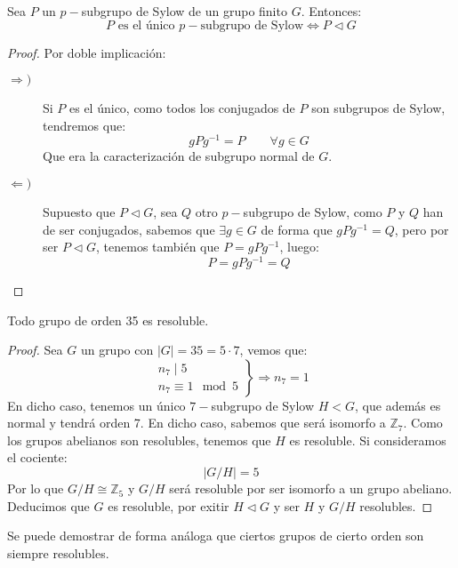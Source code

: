 \begin{coro}
    Sea $P$ un $p-$subgrupo de Sylow de un grupo finito $G$. Entonces:
    \begin{equation*}
        P \text{\ es el único $p-$subgrupo de Sylow} \Longleftrightarrow P\lhd G
    \end{equation*}
    \begin{proof}
            Por doble implicación:
        \begin{description}
            \item [$\Longrightarrow)$] Si $P$ es el único, como todos los conjugados de $P$ son subgrupos de Sylow, tendremos que:
                \begin{equation*}
                    gPg^{-1} = P \qquad \forall g\in G
                \end{equation*}
                Que era la caracterización de subgrupo normal de $G$.
            \item [$\Longleftarrow)$] Supuesto que $P\lhd G$, sea $Q$ otro $p-$subgrupo de Sylow, como $P$ y $Q$ han de ser conjugados, sabemos que $\exists g\in G$ de forma que $gPg^{-1} = Q$, pero por ser $P\lhd G$, tenemos también que $P = gPg^{-1}$, luego:
                \begin{equation*}
                    P = gPg^{-1} = Q
                \end{equation*} \qedhere
        \end{description}
    \end{proof}
\end{coro}

\begin{ejemplo}
    Todo grupo de orden 35 es resoluble.
    \begin{proof}
        Sea $G$ un grupo con $|G| = 35 = 5\cdot 7$, vemos que:
        \begin{equation*}
            \left.\begin{array}{r}
                n_7 \mid 5 \\
                n_7\equiv 1 \mod 5
            \end{array}\right\} \Longrightarrow n_7 = 1
        \end{equation*}
        En dicho caso, tenemos un único $7-$subgrupo de Sylow $H<G$, que además es normal y tendrá orden 7. En dicho caso, sabemos que será isomorfo a $\mathbb{Z}_7$. Como los grupos abelianos son resolubles, tenemos que $H$ es resoluble. Si consideramos el cociente:
        \begin{equation*}
            |G/H| = 5
        \end{equation*}
        Por lo que $G/H\cong \mathbb{Z}_5$ y $G/H$ será resoluble por ser isomorfo a un grupo abeliano. Deducimos que $G$ es resoluble, por exitir $H\lhd G$ y ser $H$ y $G/H$ resolubles.
    \end{proof}
    \noindent
    Se puede demostrar de forma análoga que ciertos grupos de cierto orden son siempre resolubles.
\end{ejemplo}

